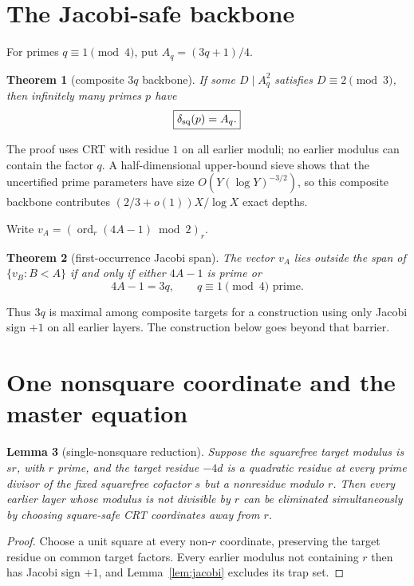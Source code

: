 \documentclass[11pt]{article}
\newtheorem{theorem}{Theorem}
\newtheorem{lemma}[theorem]{Lemma}
\theoremstyle{definition}
\newcommand{\sqdepth}{\delta_{\rm sq}}
\begin{document}
\section{The Jacobi-safe backbone}
For primes $q\equiv1\pmod4$, put $A_q=(3q+1)/4$.

\begin{theorem}[composite $3q$ backbone]\label{thm:3q}
If some $D\mid A_q^2$ satisfies $D\equiv2\pmod3$, then infinitely many primes $p$ have
\[
\boxed{\sqdepth(p)=A_q.}
\]
\end{theorem}

The proof uses CRT with residue $1$ on all earlier moduli; no earlier modulus can contain the factor $q$. A half-dimensional upper-bound sieve shows that the uncertified prime parameters have size $O(Y(\log Y)^{-3/2})$, so this composite backbone contributes $(2/3+o(1))X/\log X$ exact depths.

Write $v_A=(\operatorname{ord}_r(4A-1)\bmod2)_r$.

\begin{theorem}[first-occurrence Jacobi span]\label{thm:span}
The vector $v_A$ lies outside the span of $\{v_B:B<A\}$ if and only if either $4A-1$ is prime or
\[
4A-1=3q,\qquad q\equiv1\pmod4\text{ prime}.
\]
\end{theorem}

Thus $3q$ is maximal among composite targets for a construction using only Jacobi sign $+1$ on all earlier layers. The construction below goes beyond that barrier.

\section{One nonsquare coordinate and the master equation}
\begin{lemma}[single-nonsquare reduction]\label{lem:single}
Suppose the squarefree target modulus is $sr$, with $r$ prime, and the target residue $-4d$ is a quadratic residue at every prime divisor of the fixed squarefree cofactor $s$ but a nonresidue modulo $r$. Then every earlier layer whose modulus is not divisible by $r$ can be eliminated simultaneously by choosing square-safe CRT coordinates away from $r$.
\end{lemma}

\begin{proof}
Choose a unit square at every non-$r$ coordinate, preserving the target residue on common target factors. Every earlier modulus not containing $r$ then has Jacobi sign $+1$, and Lemma~\ref{lem:jacobi} excludes its trap set.
\end{proof}
\end{document}
